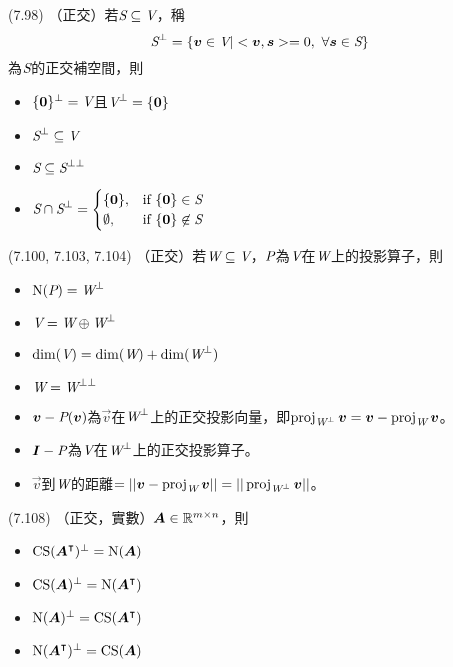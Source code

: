 \item \begin{theorem}{(7.98)} （正交）若$\spc{S} \subseteq \V$，稱
	\begin{equation}
		\spc{S}^{\perp} = \{\vec{v} \in \V | \dotp{\vec{v}}{\vec{s}} = 0, \ \forall \vec{s} \in \spc{S}\}
	\end{equation}
	為$\spc{S}$的正交補空間，則
	\begin{itemize}
		\item $\{\vec{0}\}^{\perp} = \V$且$\V^{\perp} = \{\vec{0}\}$
		\item $\spc{S}^{\perp} \subseteq \V$
		\item $\spc{S} \subseteq \spc{S}^{\perp\perp}$
		\item $\spc{S} \cap \spc{S}^{\perp} = 
		\begin{cases}
			\{\vec{0}\}, & \text{if} \ \{\vec{0}\} \in \spc{S} \\
			\emptyset, & \text{if} \ \{\vec{0}\} \not\in \spc{S}
		\end{cases}$
	\end{itemize}
\end{theorem}

\item \begin{theorem}{(7.100, 7.103, 7.104)} （正交）若$\spc{W} \subseteq \V$，$\P$為$\V$在$\spc{W}$上的投影算子，則
	\begin{itemize}
		\item $\Ker(\P) = \spc{W}^{\perp}$
		\item $\V = \spc{W} \oplus \spc{W}^{\perp}$
		\item $\dim(\V) = \dim(\spc{W}) + \dim(\spc{W}^{\perp})$
		\item $\spc{W} = \spc{W}^{\perp\perp}$
		\item $\vec{v} - \P(\vec{v})$為$\vec{v}$在$\spc{W}^{\perp}$上的正交投影向量，即$\proj{\spc{W}^{\perp}}{v} = \vec{v} - \proj{\spc{W}}{v}$。
		\item $\mat{I} - \P$為$\V$在$\spc{W}^{\perp}$上的正交投影算子。
		\item $\vec{v}$到$\spc{W}$的距離$ = ||\vec{v} - \proj{\spc{W}}{v}|| = ||\proj{\spc{W}^{\perp}}{v}||$。
	\end{itemize}
\end{theorem}

\item \begin{theorem}{(7.108)} （正交，實數）$\mat{A} \in \R^{m \times n}$，則
	\begin{itemize}
		\item $\cs(\mat{A}^{\intercal})^{\perp} = \Ker(\mat{A})$
		\item $\cs(\mat{A})^{\perp} = \Ker(\mat{A}^{\intercal})$
		\item $\Ker(\mat{A})^{\perp} = \cs(\mat{A}^{\intercal})$
		\item $\Ker(\mat{A}^{\intercal})^{\perp} = \cs(\mat{A})$
	\end{itemize}
\end{theorem}

